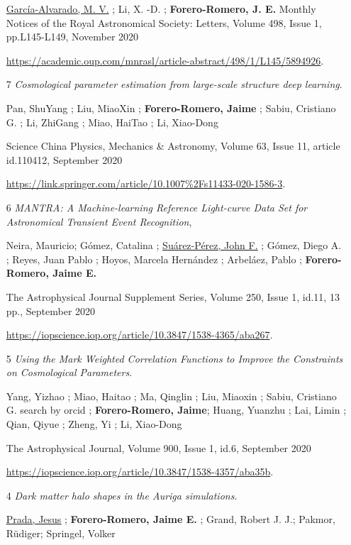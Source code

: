 \documentclass{article}
\begin{document}
\begin{itemize}
\underline{García-Alvarado, M. V.} ; Li, X. -D. ; \textbf{Forero-Romero, J. E.} 
Monthly Notices of the Royal Astronomical Society: Letters, Volume 498, Issue 1, pp.L145-L149, November 2020

\url{https://academic.oup.com/mnrasl/article-abstract/498/1/L145/5894926}. 

\item[7]{\it Cosmological parameter estimation from large-scale structure deep learning}. 

Pan, ShuYang ; Liu, MiaoXin ; \textbf{Forero-Romero, Jaime} ; Sabiu, Cristiano G. ; Li, ZhiGang ; Miao, HaiTao ; Li, Xiao-Dong

Science China Physics, Mechanics \& Astronomy, Volume 63, Issue 11, article id.110412, September 2020

\url{https://link.springer.com/article/10.1007%2Fs11433-020-1586-3}. 


\item[6]{\it MANTRA: A Machine-learning Reference Light-curve Data Set for Astronomical Transient Event Recognition}, 

Neira, Mauricio; Gómez, Catalina ; \underline{\underline{Suárez-Pérez, John F.}} ; Gómez, Diego A. ; Reyes, Juan Pablo ; Hoyos, Marcela Hernández ; Arbeláez, Pablo ; \textbf{Forero-Romero, Jaime E.}

The Astrophysical Journal Supplement Series, Volume 250, Issue 1, id.11, 13 pp., September 2020

\url{https://iopscience.iop.org/article/10.3847/1538-4365/aba267}.

\item[5]{\it Using the Mark Weighted Correlation Functions to Improve the Constraints on Cosmological Parameters}.  

Yang, Yizhao ; Miao, Haitao ; Ma, Qinglin ; Liu, Miaoxin ; Sabiu, Cristiano G. search by orcid ; \textbf{Forero-Romero, Jaime}; Huang, Yuanzhu ; Lai, Limin ; Qian, Qiyue ; Zheng, Yi ; Li, Xiao-Dong

The Astrophysical Journal, Volume 900, Issue 1, id.6, September 2020

\url{https://iopscience.iop.org/article/10.3847/1538-4357/aba35b}.

\item[4]{\it Dark matter halo shapes in the Auriga simulations}.

 \underline{\underline{Prada, Jesus}} ; \textbf{Forero-Romero, Jaime E.} ; Grand, Robert J. J.; Pakmor, Rüdiger; Springel, Volker


\end{itemize}
\end{document}
